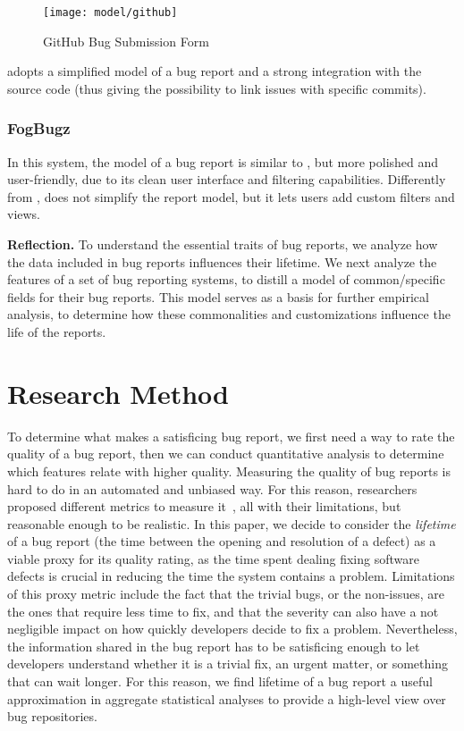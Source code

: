 \begin{figure}[ht]
\centering
  \texttt{[image: model/github]}
  \caption{GitHub Bug Submission Form}
  \label{fig:github-interface}
\end{figure}%

\gth adopts a simplified model of a bug report and a strong integration with the source code (thus giving the possibility to link issues with specific commits).

\subsubsection{FogBugz} In this system, the model of a bug report is similar to \bzilla, but more polished and user-friendly, due to its clean user interface and filtering capabilities. Differently from \gth, \fbz{} does not simplify the report model, but it lets users add custom filters and views.

{\bf Reflection.} To understand the essential traits of bug reports, we analyze how the data included in bug reports influences their lifetime. We next analyze the features of a set of bug reporting systems, to distill a model of common/specific fields for their bug reports. This model serves as a basis for further empirical analysis, to determine how these commonalities and customizations influence the life of the reports.


\section{Research Method} \label{sec:method}

To determine what makes a satisficing bug report, we first need a way to rate the quality of a bug report, then we can conduct quantitative analysis to determine which features relate with higher quality. Measuring the quality of bug reports is hard to do in an automated and unbiased way. For this reason, researchers proposed different metrics to measure it~\cite{Hooi2007}, all with their limitations, but reasonable enough to be realistic. In this paper, we decide to consider the \emph{lifetime} of a bug report (\ie the time between the opening and resolution of a defect) as a viable proxy for its quality rating, as the time spent dealing fixing software defects is crucial in reducing the time the system contains a problem. Limitations of this proxy metric include the fact that the trivial bugs, or the non-issues, are the ones that require less time to fix, and that the severity can also have a not negligible impact on how quickly developers decide to fix a problem. Nevertheless, the information shared in the bug report has to be satisficing enough to let developers understand whether it is a trivial fix, an urgent matter, or something that can wait longer. For this reason, we find lifetime of a bug report a useful approximation in aggregate statistical analyses to provide a high-level view over bug repositories. 

